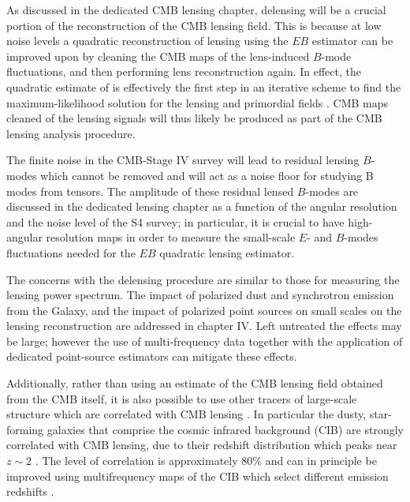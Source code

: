 As discussed in the dedicated CMB lensing chapter, delensing will be a crucial portion of the reconstruction of the CMB lensing field.  This is because at low noise levels a quadratic reconstruction of lensing using the $EB$ estimator \cite{Hu:2001k} can be improved upon by cleaning the CMB maps of the lens-induced $B$-mode fluctuations, and then performing lens reconstruction again.  In effect, the quadratic estimate of \cite{Hu:2001k} is effectively the first step in an iterative scheme to find the maximum-likelihood solution for the lensing and primordial fields \cite{HirataSeljak0209489}.  CMB maps cleaned of the lensing signals will thus likely be produced as part of the CMB lensing analysis procedure.

The finite noise in the CMB-Stage IV survey will lead to residual lensing $B$-modes which cannot be removed and will act as a noise floor for studying B modes from tensors.  The amplitude of these residual lensed $B$-modes are discussed in the dedicated lensing chapter as a function of the angular resolution and the noise level of the S4 survey; in particular, it is crucial to have high-angular resolution maps in order to measure the small-scale $E$- and $B$-modes fluctuations needed for the $EB$ quadratic lensing estimator.

The concerns with the delensing procedure are similar to those for measuring the lensing power spectrum. The impact of polarized dust and synchrotron emission from the Galaxy, and the impact of polarized point sources on small scales on the lensing reconstruction are addressed in chapter IV. Left untreated the effects may be large; however the use of  multi-frequency data together with the application of dedicated point-source estimators can mitigate these effects.

Additionally, rather than using an estimate of the CMB lensing field obtained from the CMB itself, it is also possible to use other tracers of large-scale structure which are correlated with  CMB lensing \cite{smith10}.  In particular the dusty, star-forming galaxies that comprise the cosmic infrared background (CIB) are strongly correlated with CMB lensing, due to their redshift distribution which peaks near $z \sim 2$ \cite{sherwin14,simard14}.  The level of correlation is approximately $80\%$ \cite{planck13-18} and can in principle be improved using multifrequency maps of the CIB which select different emission redshifts \cite{sherwin14}.  

